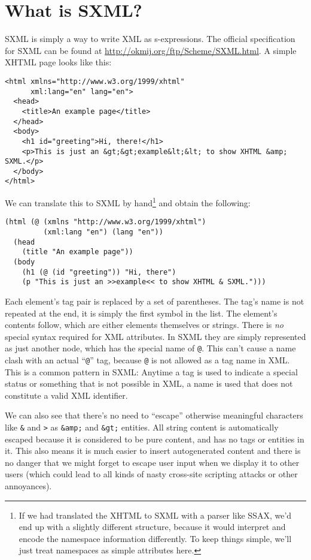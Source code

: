 \documentclass{article}
\begin{document}
\section{What is SXML?}

SXML is simply a way to write XML as s-expressions.  The official
specification for SXML can be found at
\url{http://okmij.org/ftp/Scheme/SXML.html}.  A simple XHTML page
looks like this:

\begin{verbatim}
<html xmlns="http://www.w3.org/1999/xhtml"
      xml:lang="en" lang="en">
  <head>
    <title>An example page</title>
  </head>
  <body>
    <h1 id="greeting">Hi, there!</h1>
    <p>This is just an &gt;&gt;example&lt;&lt; to show XHTML &amp; SXML.</p>
  </body>
</html>
\end{verbatim}

We can translate this to SXML by hand\footnote{If we had translated
  the XHTML to SXML with a parser like SSAX, we'd end up with a
  slightly different structure, because it would interpret and encode
  the namespace information differently.  To keep things simple, we'll
  just treat namespaces as simple attributes here.} and obtain the
following:

\begin{verbatim}
(html (@ (xmlns "http://www.w3.org/1999/xhtml")
         (xml:lang "en") (lang "en"))
  (head
    (title "An example page"))
  (body
    (h1 (@ (id "greeting")) "Hi, there")
    (p "This is just an >>example<< to show XHTML & SXML.")))
\end{verbatim}

Each element's tag pair is replaced by a set of parentheses.  The
tag's name is not repeated at the end, it is simply the first symbol
in the list.  The element's contents follow, which are either elements
themselves or strings. There is \emph{no} special syntax required for
XML attributes.  In SXML they are simply represented as just another
node, which has the special name of \verb|@|.  This can't cause a name
clash with an actual ``\verb|@|'' tag, because \verb|@| is not allowed
as a tag name in XML.  This is a common pattern in SXML: Anytime a tag
is used to indicate a special status or something that is not possible
in XML, a name is used that does not constitute a valid XML
identifier.

We can also see that there's no need to ``escape'' otherwise
meaningful characters like \verb|&| and \verb|>| as \verb|&amp;| and
\verb|&gt;| entities.  All string content is automatically escaped
because it is considered to be pure content, and has no tags or
entities in it.  This also means it is much easier to insert
autogenerated content and there is no danger that we might forget to
escape user input when we display it to other users (which could lead
to all kinds of nasty cross-site scripting attacks or other
annoyances).
\end{document}
